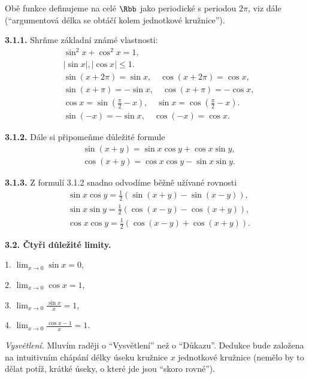 \documentclass[12pt]{article}
\begin{document}
{\vskip12mm
  
\noindent Obě funkce definujeme na celé $\Rbb$ jako periodické s periodou $2\pi$,  viz dále (``argumentová délka se
obtáčí kolem jednotkové kružnice''). 

\medskip

{\bf 3.1.1.} Shrňme základní známé vlastnosti:
  $$
  \begin{aligned}
  &\sin^2x+\cos^2x=1,\\
  &|\sin x|,|\cos x|\leq 1.\\
  &\sin(x+2\pi)=\sin x, \quad \cos(x+2\pi)=\cos x,\\
  &\sin(x+\pi)=-\sin x, \quad \cos(x+\pi)=-\cos x,\\
  &\cos x=\sin (\frac{\pi}{2}-x),\quad \sin x=\cos (\frac{\pi}{2}-x).\\
  &\sin(-x)=-\sin x,\quad \cos(-x)=\cos x.
  \end{aligned}
  $$
  
  \medskip
  
  {\bf 3.1.2.} Dále si připomeňme důležité formule 
$$
\begin{aligned}
&\sin(x+y)=\sin x\cos y+\cos x\sin y,\\
&\cos(x+y)=\cos x\cos y-\sin x\sin y.
\end{aligned}
$$

\bigskip

{\bf 3.1.3.} Z formulí 3.1.2 snadno odvodíme běžně užívané rovnosti
$$
\begin{aligned}
&\sin x\cos y=\frac12(\sin(x+y)-\sin(x-y)),\\
&\sin x\sin y=\frac12(\cos(x-y)-\cos(x+y)),\\
&\cos x\cos y=\frac12(\cos(x-y)+\cos(x+y)).
\end{aligned}
$$

\bigskip

{\bf 3.2. Čtyři důležité limity.} 

\hskip20mm 1. $\lim_{x\to 0}\sin x=0$,

 \hskip20mm 2.  $\lim_{x\to 0}\cos x=1$,
 
 \hskip20mm 3.  $\lim_{x\to 0}\frac{\sin x}{x}=1$, 
 
\hskip20mm 4. $\lim_{x\to 0}\frac{\cos x-1}{x}=1$.

\medskip

{\em Vysvětlení.} Mluvím raději o  ``Vysvětlení'' než o ``Důkazu''. Dedukce bude založena na intuitivním chápání délky úseku kružnice $x$ jednotkové kružnice (nemělo by to dělat potíž, krátké úseky, o které jde jsou ``skoro rovné'').

}
\end{document}
